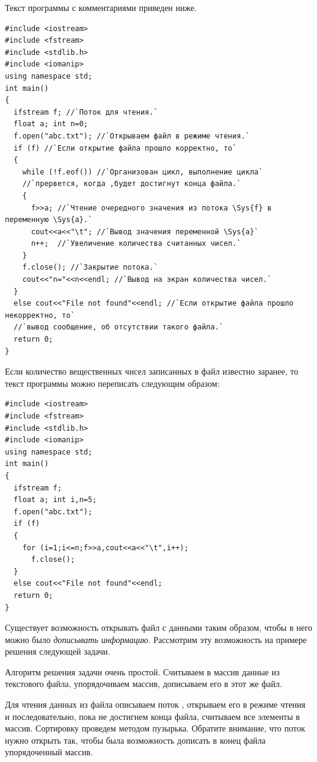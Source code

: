 Текст программы с комментариями приведен ниже.
\begin{lstlisting}
#include <iostream>
#include <fstream>
#include <stdlib.h>
#include <iomanip>
using namespace std;
int main()
{
  ifstream f; //`Поток для чтения.`
  float a; int n=0;
  f.open("abc.txt"); //`Открываем файл в режиме чтения.`
  if (f) //`Если открытие файла	прошло корректно, то`
  {
    while (!f.eof()) //`Организован цикл, выполнение цикла`
    //`прервется, когда ,будет достигнут конца файла.`
    {
      f>>a; //`Чтение очередного значения из потока \Sys{f} в переменную \Sys{a}.`
      cout<<a<<"\t"; //`Вывод значения переменной \Sys{a}` 
      n++;  //`Увеличение количества считанных чисел.`
    }
    f.close(); //`Закрытие потока.`
    cout<<"n="<<n<<endl; //`Вывод на экран количества чисел.`
  }
  else cout<<"File not found"<<endl; //`Если открытие файла прошло некорректно, то`
  //`вывод сообщение, об отсутствии такого файла.`
  return 0;
}
\end{lstlisting}

Если количество вещественных чисел записанных в файл известно заранее, то текст программы можно переписать следующим
образом:
\begin{lstlisting}
#include <iostream>
#include <fstream>
#include <stdlib.h>
#include <iomanip>
using namespace std;
int main()
{
  ifstream f;
  float a; int i,n=5;
  f.open("abc.txt");
  if (f)
  {
    for (i=1;i<=n;f>>a,cout<<a<<"\t",i++);
      f.close();
  }
  else cout<<"File not found"<<endl;
  return 0;
}
\end{lstlisting}

Существует возможность открывать файл с данными таким образом, чтобы в него можно было \emph{дописывать
информацию}. Рассмотрим эту возможность на примере решения следующей задачи.


Алгоритм решения задачи очень простой. Считываем в массив данные из текстового файла, упорядочиваем массив, дописываем
его в этот же файл.

Для чтения данных из файла описываем поток , открываем его в режиме чтения и последовательно,
пока не достигнем конца файла, считываем все элементы в массив. Сортировку проведем методом пузырька. Обратите
внимание, что поток нужно открыть так, чтобы была возможность дописать в конец файла упорядоченный массив.

